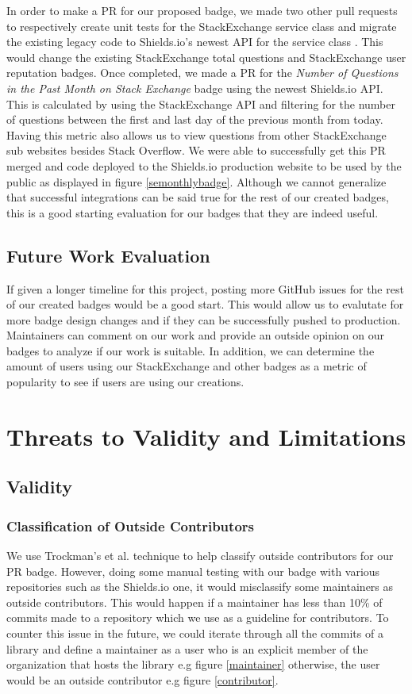 \documentclass[12pt, letterpaper]{article}
\begin{document}
In order to make a PR for our proposed badge, we made two other pull requests to respectively
create unit tests for the StackExchange service class \cite{testspr} and migrate the existing legacy code to Shields.io's newest
API for the service class \cite{portpr}. This would change the existing StackExchange total questions and StackExchange
user reputation badges. Once completed, we made a PR for the \textit{Number of Questions in the Past Month on Stack Exchange}
badge \cite{sepr} using the newest Shields.io API. This is calculated by using the StackExchange API and filtering for the 
number of questions between the first and last day of the previous month from today. Having this metric also
allows us to view questions from other StackExchange sub websites besides Stack Overflow.
We were able to successfully get this PR merged and code deployed to the Shields.io \cite{shields} 
production website to be used by the public as displayed in figure \ref{semonthlybadge}. 
Although we cannot generalize that successful integrations can be said
true for the rest of our created badges, this is a good starting evaluation for our badges
that they are indeed useful. 

\subsection{Future Work Evaluation}
If given a longer timeline for this project, posting more GitHub issues for the rest of
our created badges would be a good start. This would allow us to evalutate for more badge design changes
and if they can be successfully pushed to production. Maintainers can comment on our work
and provide an outside opinion on our badges to analyze if our work is suitable. 
In addition, we can determine the amount of users using our StackExchange and other badges as
a metric of popularity to see if users are using our creations. 

\section{Threats to Validity and Limitations}

\subsection{Validity}
\subsubsection{Classification of Outside Contributors}
We use Trockman's et al. \cite{githubbadges} technique to help classify outside contributors for our PR badge.
However, doing some manual testing with our badge with various repositories such
as the Shields.io \cite{shieldsrepo} one, it would misclassify some maintainers as outside contributors.
This would happen if a maintainer has less than 10\% of commits made to a repository which we use as a guideline
for contributors.
To counter this issue in the future, we could iterate through all the commits of a library and define a maintainer as a user who is an explicit 
member of the organization that hosts
the library e.g figure \ref{maintainer} otherwise, the user would be an outside contributor e.g figure \ref{contributor}. 
\end{document}
